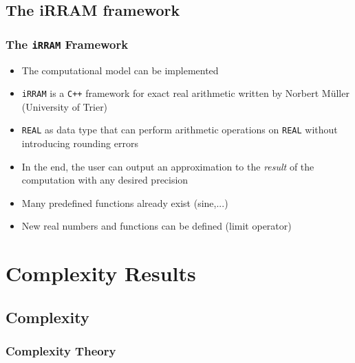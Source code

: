 \documentclass[xcolor=pdftex,dvipsnames,table,handout]{beamer}
\newcommand{\cc}{\texttt{C++}\xspace}
\newcommand{\irram}{\texttt{iRRAM}\xspace}
\newcommand{\code}[1]{\texttt{#1}}
\newcommand{\sharpp}{\ensuremath{\#\mathcal P}\xspace}
\newcommand{\p}{\ensuremath{\mathcal P}\xspace}
\newcommand{\np}{\ensuremath{\mathcal{ NP }}\xspace}
\newcommand{\pspace}{\ensuremath{\mathcal{ PSPACE }}\xspace}
\newcommand{\npc}{\ensuremath{\mathcal{ NP }c}\xspace}
\newcommand{\eXp}{\ensuremath{\mathcal{EXP}}\xspace}
\newcommand{\real}{\code{REAL}\xspace}
\begin{document}
\subsection{The iRRAM framework}
\begin{frame}
  \frametitle{The \irram Framework}
  \begin{itemize}[<+->]
  \item The computational model can be implemented
  \item \irram is a \cc framework for exact real arithmetic written by Norbert M\"{u}ller (University of Trier)
  \item \real as data type that can perform arithmetic operations on \real without introducing rounding errors
  \item In the end, the user can output an approximation to the \emph{result} of the computation with any desired precision
  \item Many predefined functions already exist (sine,...)
  \item New real numbers and functions can be defined (limit operator)
  \end{itemize}
\end{frame}
\section{Complexity Results}
\subsection{Complexity}
\begin{frame}
  \frametitle{Complexity Theory}
  \centering
  \end{frame}
\end{document}
